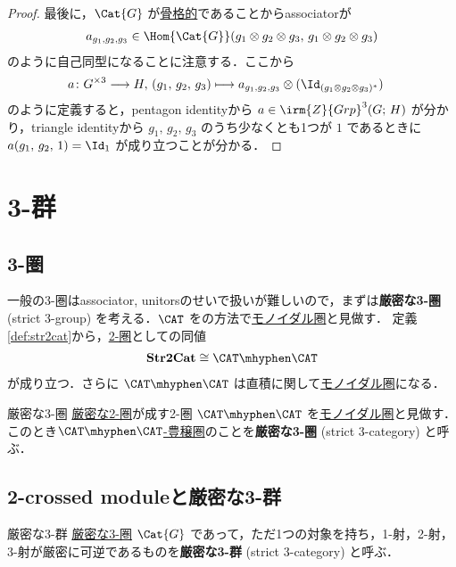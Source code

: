 \documentclass[TQFT_main]{subfiles}
\begin{document}
\begin{proof}
    最後に，$\Cat{G}$ が\hyperref[def:skeltal2G]{骨格的}であることからassociatorが
    \begin{align}
        a_{g_1,g_2,g_3} \in \Hom{\Cat{G}}(g_1 \otimes g_2 \otimes g_3,\, g_1 \otimes g_2 \otimes g_3)
    \end{align}
    のように自己同型になることに注意する．ここから
    \begin{align}
        a \colon G^{\times 3} \lto H,\, (g_1,\, g_2,\, g_3) &\lmto a_{g_1,g_2,g_3} \otimes (\Id_{(g_1 \otimes g_2 \otimes g_3)^*})
    \end{align}
    のように定義すると，pentagon identityから $a \in \irm{Z}{Grp}^3(G;\, H)$ が分かり，triangle identityから $g_1,\, g_2,\, g_3$ のうち少なくとも1つが $1$ であるときに $a(g_1,\, g_2,\, 1) = \Id_1$ が成り立つことが分かる．
\end{proof}


\section{3-群}

\subsection{3-圏}

一般の3-圏はassociator, unitorsのせいで扱いが難しいので，まずは\textbf{厳密な3-圏} (strict 3-group) を考える．$\CAT$ をの方法で\hyperref[redef:monoidal-category]{モノイダル圏}と見做す．
定義\ref{def:str2cat}から，\hyperref[def:2cat]{2-圏}としての同値
\begin{align}
    \bm{\mathrm{Str2Cat}} \cong \CAT\mhyphen\CAT
\end{align}
が成り立つ．さらに $\CAT\mhyphen\CAT$ は直積に関して\hyperref[redef:monoidal-category]{モノイダル圏}になる．

\begin{mydef}[label=def:str3cat]{厳密な3-圏}
    \hyperref[def:str2cat]{厳密な2-圏}が成す2-圏 $\CAT\mhyphen\CAT$ を\hyperref[redef:monoidal-category]{モノイダル圏}と見做す．
    このとき\hyperref[redef:enriched]{$\CAT\mhyphen\CAT$-豊穣圏}のことを\textbf{厳密な3-圏} (strict 3-category) と呼ぶ．
\end{mydef}

\subsection{2-crossed moduleと厳密な3-群}

\begin{mydef}[label=def:S3G]{厳密な3-群}
    \hyperref[def:str3-cat]{厳密な3-圏} $\Cat{G}$ であって，ただ1つの対象を持ち，1-射，2-射，3-射が厳密に可逆であるものを\textbf{厳密な3-群} (strict 3-category) と呼ぶ．
\end{mydef}
\end{document}
